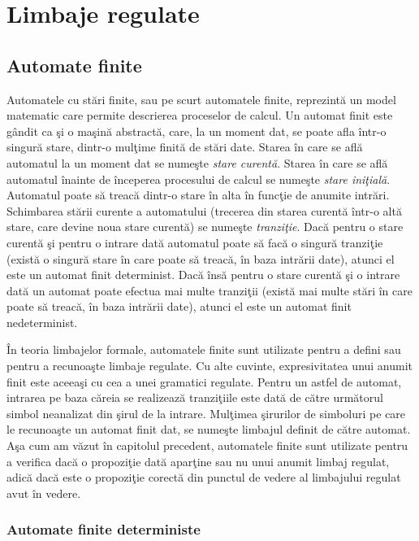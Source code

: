 \chapter{Limbaje regulate}
\label{ch:automate}

\section{Automate finite}

Automatele cu stări finite, sau pe scurt automatele finite, reprezintă un model matematic care permite descrierea proceselor de calcul. Un automat finit este gândit ca şi o maşină abstractă, care, la un moment dat, se poate afla într-o singură stare, dintr-o mulţime finită de stări date. Starea în care se află automatul la un moment dat se numeşte \textit{stare curentă}. Starea în care se află automatul înainte de începerea procesului de calcul se numeşte \textit{stare iniţială}. Automatul poate să treacă dintr-o stare în alta în funcţie de anumite intrări. Schimbarea stării curente a automatului (trecerea din starea curentă într-o altă stare, care devine noua stare curentă) se numeşte \textit{tranziţie}. Dacă pentru o stare curentă şi pentru o intrare dată automatul poate să facă o singură tranziţie (există o singură stare în care poate să treacă, în baza intrării date), atunci el este un automat finit determinist. Dacă însă pentru o stare curentă şi o intrare dată un automat poate efectua mai multe tranziţii (există mai multe stări în care poate să treacă, în baza intrării date), atunci el este un automat finit nedeterminist.

În teoria limbajelor formale, automatele finite sunt utilizate pentru a defini sau pentru a recunoaşte limbaje regulate. Cu alte cuvinte, expresivitatea unui anumit finit este aceeaşi cu cea a unei gramatici regulate. Pentru un astfel de automat, intrarea pe baza căreia se realizează tranziţiile este dată de către următorul simbol neanalizat din şirul de la intrare. Mulţimea şirurilor de simboluri pe care le recunoaşte un automat finit dat, se numeşte limbajul definit de către automat. Aşa cum am văzut în capitolul precedent, automatele finite sunt utilizate pentru a verifica dacă o propoziţie dată aparţine sau nu unui anumit limbaj regulat, adică dacă este o propoziţie corectă din punctul de vedere al limbajului regulat avut în vedere.

\subsection{Automate finite deterministe}

